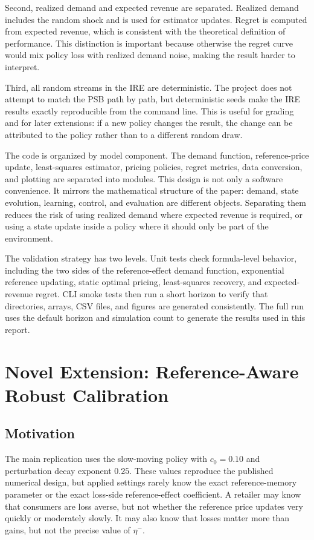 \documentclass[conference]{../../LaTex_Template/IEEEtran}
\begin{document}
Second, realized demand and expected revenue are separated. Realized demand includes the random shock and is used for estimator updates. Regret is computed from expected revenue, which is consistent with the theoretical definition of performance. This distinction is important because otherwise the regret curve would mix policy loss with realized demand noise, making the result harder to interpret.

Third, all random streams in the IRE are deterministic. The project does not attempt to match the PSB path by path, but deterministic seeds make the IRE results exactly reproducible from the command line. This is useful for grading and for later extensions: if a new policy changes the result, the change can be attributed to the policy rather than to a different random draw.

The code is organized by model component. The demand function, reference-price update, least-squares estimator, pricing policies, regret metrics, data conversion, and plotting are separated into modules. This design is not only a software convenience. It mirrors the mathematical structure of the paper: demand, state evolution, learning, control, and evaluation are different objects. Separating them reduces the risk of using realized demand where expected revenue is required, or using a state update inside a policy where it should only be part of the environment.

The validation strategy has two levels. Unit tests check formula-level behavior, including the two sides of the reference-effect demand function, exponential reference updating, static optimal pricing, least-squares recovery, and expected-revenue regret. CLI smoke tests then run a short horizon to verify that directories, arrays, CSV files, and figures are generated consistently. The full run uses the default horizon and simulation count to generate the results used in this report.

\section{Novel Extension: Reference-Aware Robust Calibration}
\subsection{Motivation}
The main replication uses the slow-moving policy with $c_0=0.10$ and perturbation decay exponent $0.25$. These values reproduce the published numerical design, but applied settings rarely know the exact reference-memory parameter or the exact loss-side reference-effect coefficient. A retailer may know that consumers are loss averse, but not whether the reference price updates very quickly or moderately slowly. It may also know that losses matter more than gains, but not the precise value of $\eta^-$.
\end{document}
